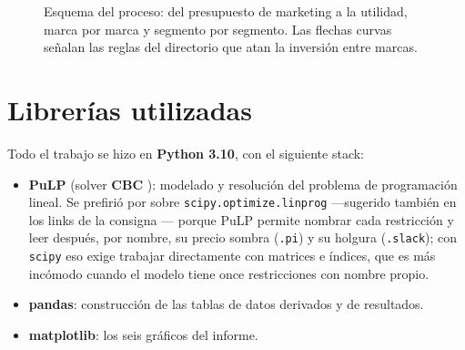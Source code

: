 \documentclass[10pt,a4paper]{article}
\begin{document}
\begin{figure}[htbp]
{}
\caption{Esquema del proceso: del presupuesto de marketing a la utilidad, marca
por marca y segmento por segmento. Las flechas curvas señalan las reglas del
directorio que atan la inversión entre marcas.}
\label{fig:proceso}
\end{figure}

\section{Librerías utilizadas}
\label{sec:librerias}

Todo el trabajo se hizo en \textbf{Python 3.10}, con el siguiente stack:

\begin{itemize}
  \item \textbf{PuLP} \cite{pulp} (solver \textbf{CBC} \cite{cbc}): modelado
  y resolución del problema de programación lineal. Se prefirió por sobre
  \texttt{scipy.optimize.linprog} —sugerido también en los links de la
  consigna \cite{consigna}— porque PuLP permite nombrar cada restricción y
  leer después, por nombre, su precio sombra (\texttt{.pi}) y su holgura
  (\texttt{.slack}); con \texttt{scipy} eso exige trabajar directamente con
  matrices e índices, que es más incómodo cuando el modelo tiene once
  restricciones con nombre propio.
  \item \textbf{pandas}: construcción de las tablas de datos derivados y de
  resultados.
  \item \textbf{matplotlib}: los seis gráficos del informe.
\end{itemize}
\end{document}
